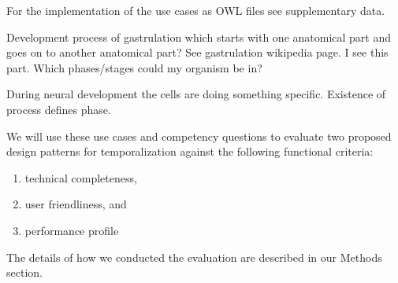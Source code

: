 \begin{itemize}
For the implementation of the use cases as OWL files see supplementary data.




Development process of gastrulation which starts with one anatomical part and goes on to another anatomical part? See gastrulation wikipedia page. 
I see this part. Which phases/stages could my organism be in?

During neural development the cells are doing something specific. Existence of process defines phase.


We will use these use cases and competency questions to evaluate two proposed design patterns for temporalization against the following functional criteria:
\begin{enumerate}
    \item technical completeness, 
    \item user friendliness, and
    \item performance profile
\end{enumerate}
The details of how we conducted the evaluation are described in our Methods section.


\end{itemize}



